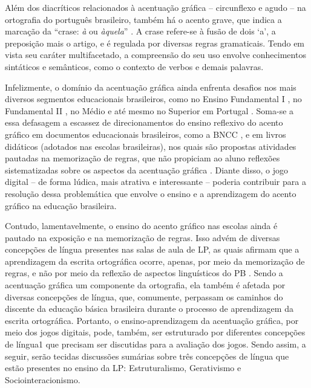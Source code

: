 \documentclass{textolivre}
\begin{document}
Além dos diacríticos relacionados à acentuação gráfica – circunflexo e agudo – na ortografia do português brasileiro, também há o acento grave, que indica a marcação da “crase: \emph{à} ou \emph{àquela}” \cite[p. 130]{cristofaro2017}. A crase refere-se à fusão de dois ‘a’, a preposição mais o artigo, e é regulada por diversas regras gramaticais. Tendo em vista seu caráter multifacetado, a compreensão do seu uso envolve conhecimentos sintáticos e semânticos, como o contexto de verbos e demais palavras.

Infelizmente, o domínio da acentuação gráfica ainda enfrenta desafios nos mais diversos segmentos educacionais brasileiros, como no Ensino Fundamental I \cite{marra2012, ney2019, cristofaro2020}, no Fundamental II \cite{couto+guimaraes2020}, no Médio \cite{sartori2015} e até mesmo no Superior em Portugal \cite{castelo2017}. Soma-se a essa defasagem a escassez de direcionamentos do ensino reflexivo do acento gráfico em documentos educacionais brasileiros, como a BNCC \cite{brasil2017, brasil2018}, e em livros didáticos (adotados nas escolas brasileiras), nos quais são propostas atividades pautadas na memorização de regras, que não propiciam ao aluno reflexões sistematizadas sobre os aspectos da acentuação gráfica \cite{couto2020}. Diante disso, o jogo digital – de forma lúdica, mais atrativa e interessante – poderia contribuir para a resolução dessa problemática que envolve o ensino e a aprendizagem do acento gráfico na educação brasileira.

Contudo, lamentavelmente, o ensino do acento gráfico nas escolas ainda é pautado na exposição e na memorização de regras. Isso advém de diversas concepções de língua presentes nas salas de aula de LP, as quais afirmam que a aprendizagem da escrita ortográfica ocorre, apenas, por meio da memorização de regras, e não por meio da reflexão de aspectos linguísticos do PB \cite{costa_val1996, couto2020}. Sendo a acentuação gráfica um componente da ortografia, ela também é afetada por diversas concepções de língua, que, comumente, perpassam os caminhos do discente da educação básica brasileira durante o processo de aprendizagem da escrita ortográfica. Portanto, o ensino-aprendizagem da acentuação gráfica, por meio dos jogos digitais, pode, também, ser estruturado por diferentes concepções de língua1 que precisam ser discutidas para a avaliação dos jogos. Sendo assim, a seguir, serão tecidas discussões sumárias sobre três concepções de língua que estão presentes no ensino da LP: Estruturalismo, Gerativismo e Sociointeracionismo.
\end{document}
